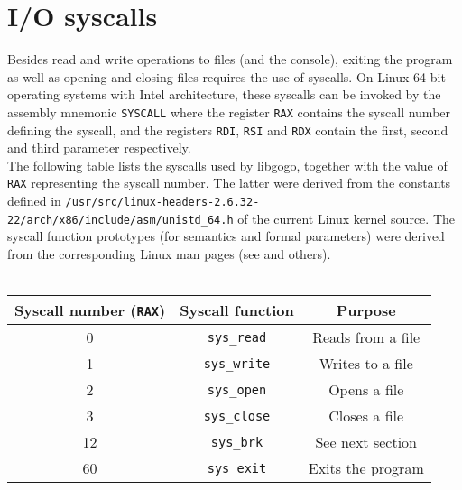 \documentclass[a4paper]{scrreprt}
\begin{document}
    \section{I/O syscalls}
      Besides read and write operations to files (and the console), exiting the program as well as opening and closing files requires the use of syscalls. On Linux 64 bit operating systems with Intel architecture, these syscalls can be invoked by the assembly mnemonic \texttt{SYSCALL} where the register \texttt{RAX} contains the syscall number defining the syscall, and the registers \texttt{RDI}, \texttt{RSI} and \texttt{RDX} contain the first, second and third parameter respectively\cite{var08}.\\
      The following table lists the syscalls used by libgogo, together with the value of \texttt{RAX} representing the syscall number. The latter were derived from the constants defined in \texttt{/usr/src/linux-headers-2.6.32-22/arch/x86/include/asm/unistd\_64.h} of the current Linux kernel source\cite{var10}. The syscall function prototypes (for semantics and formal parameters) were derived from the corresponding Linux man pages (see \cite{var97} and others).\\ \\
      \begin{tabular}{|c|c|c|}
        \hline
        \textbf{Syscall number (\texttt{RAX})} & \textbf{Syscall function} & \textbf{Purpose}\\ \hline
        0 & \texttt{sys\_read} & Reads from a file\\ \hline
        1 & \texttt{sys\_write} & Writes to a file\\ \hline
        2 & \texttt{sys\_open} & Opens a file\\ \hline
        3 & \texttt{sys\_close} & Closes a file\\ \hline
        12 & \texttt{sys\_brk} & See next section\\ \hline
        60 & \texttt{sys\_exit} & Exits the program\\ \hline
      \end{tabular}
\end{document}
